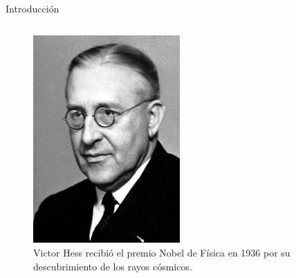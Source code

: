 \begin{frame}{Introducción}
\begin{columns}
            \begin{column}{0.3\textwidth} %
                \begin{figure}
                    \centering
                    \includegraphics[width=0.5\textwidth]{Figures/vhess.jpg}
                    \caption{\tiny Victor Hess recibió el premio Nobel de Física en 1936 por su descubrimiento de los rayos cósmicos.}
                \end{figure}
            \end{column}            
        \end{columns} 
    \end{frame}

